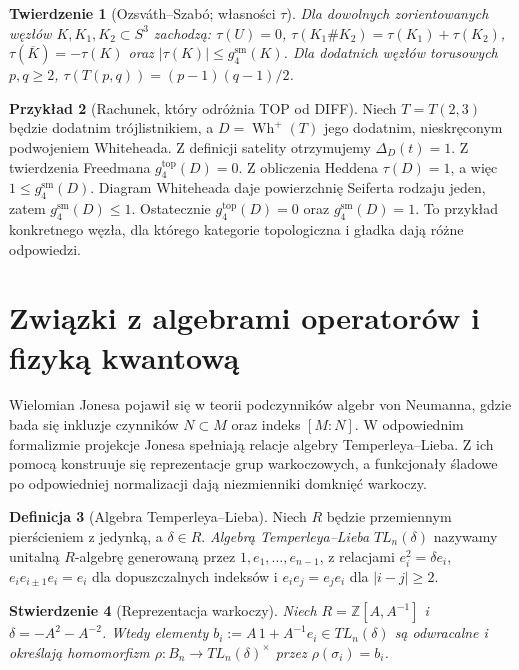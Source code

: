 \documentclass[11pt,a4paper]{report}
\numberwithin{equation}{section}
\theoremstyle{plain}
\newtheorem{twierdzenie}{Twierdzenie}[section]
\newtheorem{stwierdzenie}[twierdzenie]{Stwierdzenie}
\theoremstyle{definition}
\newtheorem{definicja}[twierdzenie]{Definicja}
\newtheorem{przyklad}[twierdzenie]{Przykład}
\theoremstyle{remark}
\begin{document}
\begin{twierdzenie}[Ozsváth--Szabó; własności $\tau$]
Dla dowolnych zorientowanych węzłów $K,K_1,K_2\subset S^3$
zachodzą:
$\tau(U)=0$,
$\tau(K_1\#K_2)=\tau(K_1)+\tau(K_2)$,
$\tau(\overline K)=-\tau(K)$ oraz
$|\tau(K)|\leq g_4^{\mathrm{sm}}(K)$.
Dla dodatnich węzłów torusowych $p,q\geq2$,
$\tau(T(p,q))=(p-1)(q-1)/2$.
\end{twierdzenie}

\begin{przyklad}[Rachunek, który odróżnia TOP od DIFF]
Niech $T=T(2,3)$ będzie dodatnim trójlistnikiem,
a $D=\operatorname{Wh}^{+}(T)$ jego dodatnim,
nieskręconym podwojeniem Whiteheada. Z definicji
satelity otrzymujemy $\Delta_D(t)=1$.
Z twierdzenia Freedmana $g_4^{\mathrm{top}}(D)=0$.
Z obliczenia Heddena $\tau(D)=1$, a więc
$1\leq g_4^{\mathrm{sm}}(D)$. Diagram Whiteheada daje
powierzchnię Seiferta rodzaju jeden, zatem
$g_4^{\mathrm{sm}}(D)\leq1$.
Ostatecznie
$g_4^{\mathrm{top}}(D)=0$ oraz $g_4^{\mathrm{sm}}(D)=1$.
To przykład konkretnego węzła, dla którego kategorie
topologiczna i gładka dają różne odpowiedzi.
\end{przyklad}

\section{Związki z algebrami operatorów i fizyką kwantową}
\label{sec:kt-operator}

Wielomian Jonesa pojawił się w teorii podczynników algebr
von Neumanna, gdzie bada się inkluzje czynników
$N\subset M$ oraz indeks $[M:N]$. W odpowiednim
formalizmie projekcje Jonesa spełniają relacje
algebry Temperleya--Lieba. Z ich pomocą konstruuje się
reprezentacje grup warkoczowych, a funkcjonały śladowe
po odpowiedniej normalizacji dają niezmienniki domknięć
warkoczy.

\begin{definicja}[Algebra Temperleya--Lieba]
Niech $R$ będzie przemiennym pierścieniem z jedynką,
a $\delta\in R$. \emph{Algebrą Temperleya--Lieba}
$TL_n(\delta)$ nazywamy unitalną $R$-algebrę generowaną
przez $1,e_1,\dots,e_{n-1}$, z relacjami
$e_i^2=\delta e_i$,
$e_ie_{i\pm1}e_i=e_i$ dla dopuszczalnych indeksów
i $e_ie_j=e_je_i$ dla $|i-j|\geq2$.
\end{definicja}

\begin{stwierdzenie}[Reprezentacja warkoczy]
Niech $R=\mathbb Z[A,A^{-1}]$ i $\delta=-A^2-A^{-2}$.
Wtedy elementy $b_i:=A\,1+A^{-1}e_i\in TL_n(\delta)$
są odwracalne i określają homomorfizm
$\rho\colon B_n\to TL_n(\delta)^\times$ przez
$\rho(\sigma_i)=b_i$.
\end{stwierdzenie}
\end{document}
